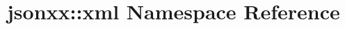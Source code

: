\hypertarget{namespacejsonxx_1_1xml}{}\section{jsonxx\+:\+:xml Namespace Reference}
\label{namespacejsonxx_1_1xml}
